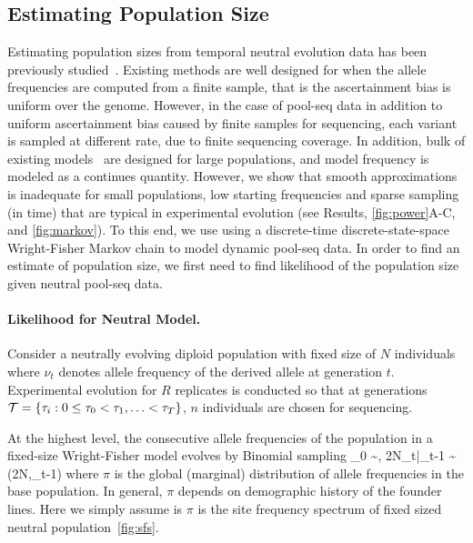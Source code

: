 \subsection{Estimating Population Size}
Estimating population sizes from temporal neutral evolution data has 
been previously studied~\cite{williamson1999using,anderson2000monte, 
bollback2008estimation, Terhorst2015Multi,jonas2016estimating}. Existing 
methods are well 
designed 
for when 
the allele 
frequencies are computed from a finite sample, that is the 
ascertainment bias 
is uniform over the genome. However, in the case of pool-seq data in 
addition 
to uniform ascertainment bias caused by finite samples for sequencing, 
each variant is sampled at different rate, due to finite sequencing 
coverage. In addition, bulk of existing 
models~\cite{bollback2008estimation,feder2014Identifying,topa2015gaussian,Terhorst2015Multi}
are designed for large populations, and model frequency is modeled as a 
continues quantity. However, we show that smooth approximations is 
inadequate for small populations, low
starting frequencies and sparse sampling (in time) that are typical in
experimental evolution (see Results, \ref{fig:power}A-C, and 
\ref{fig:markov}). To this end, we use using a discrete-time
discrete-state-space Wright-Fisher Markov chain to model dynamic 
pool-seq data. 
In order to find an estimate of population size, we first need to find 
likelihood of the population size given neutral pool-seq data.


\paragraph{Likelihood for Neutral Model.}
Consider a neutrally evolving diploid population with fixed size of  
$N$ 
individuals where 
$\nu_t$ denotes allele frequency of the derived allele at generation 
$t$.
Experimental evolution for $R$ replicates is conducted so that at 
generations 
 ${\cal T}= \{\tau_i: 0\le \tau_0<\tau_1,\ldots< \tau_T\}$, $n$ individuals 
 are chosen for sequencing. 
 

 At the highest level, the consecutive allele frequencies of the population in 
 a fixed-size Wright-Fisher model evolves by Binomial sampling
 \beq
 \nu_0 \sim \pi, \hspace{1in} 2N\nu_t|\nu_{t-1} \sim \bino(2N,\nu_{t-1})
 \eeq
where $\pi$ is the global (marginal) distribution of allele frequencies in the 
base 
population. In general, $\pi$ depends on demographic history of the founder 
lines. Here we simply assume is $\pi$ is the site frequency spectrum of fixed 
sized neutral population~\ref{fig:sfs}.

